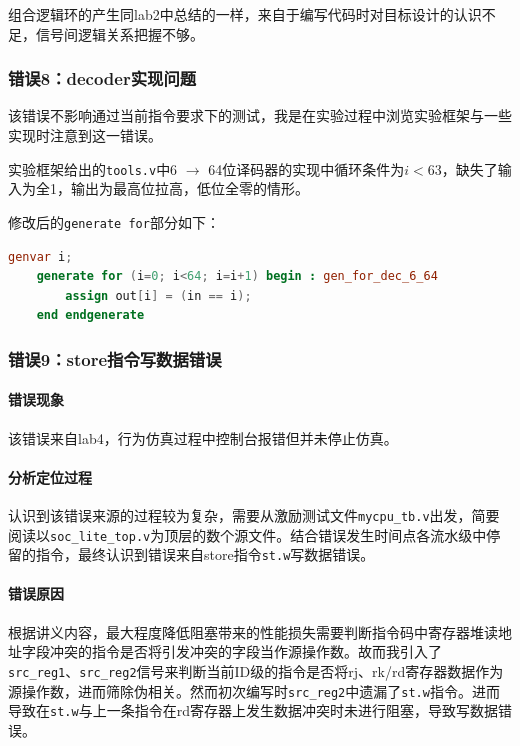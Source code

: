\documentclass[UTF-8,twoside,c5size]{ctexart}
\begin{document}
	组合逻辑环的产生同lab2中总结的一样，来自于编写代码时对目标设计的认识不足，信号间逻辑关系把握不够。
	
	\subsubsection{错误\textbf{8：}decoder实现问题}
	
	该错误不影响通过当前指令要求下的测试，我是在实验过程中浏览实验框架与一些实现时注意到这一错误。
	
	实验框架给出的\texttt{tools.v}中6 $ \to $ 64位译码器的实现中循环条件为$ i < 63 $，缺失了输入为全1，输出为最高位拉高，低位全零的情形。
	
	修改后的\texttt{generate for}部分如下：
	\begin{lstlisting}[language=verilog]
	genvar i;
	generate for (i=0; i<64; i=i+1) begin : gen_for_dec_6_64
		assign out[i] = (in == i);
	end endgenerate
	\end{lstlisting}

	\subsubsection{错误\textbf{9：}store指令写数据错误}
	
	\paragraph{错误现象}\hfill
	
	该错误来自lab4，行为仿真过程中控制台报错但并未停止仿真。
	
	\paragraph{分析定位过程}\hfill
	
	认识到该错误来源的过程较为复杂，需要从激励测试文件\texttt{mycpu\_tb.v}出发，简要阅读以\texttt{soc\_lite\_top.v}为顶层的数个源文件。结合错误发生时间点各流水级中停留的指令，最终认识到错误来自store指令\texttt{st.w}写数据错误。
	
	\paragraph{错误原因}\hfill
	
	根据讲义内容，最大程度降低阻塞带来的性能损失需要判断指令码中寄存器堆读地址字段冲突的指令是否将引发冲突的字段当作源操作数。故而我引入了\texttt{src\_reg1}、\texttt{src\_reg2}信号来判断当前ID级的指令是否将rj、rk/rd寄存器数据作为源操作数，进而筛除伪相关。然而初次编写时\texttt{src\_reg2}中遗漏了\texttt{st.w}指令。进而导致在\texttt{st.w}与上一条指令在rd寄存器上发生数据冲突时未进行阻塞，导致写数据错误。
	
\end{document}
